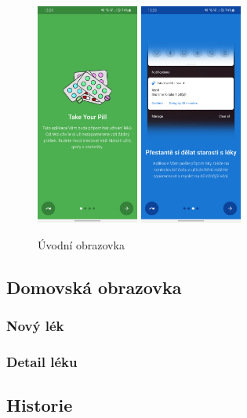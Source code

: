 \documentclass[a4paper,12pt]{report}
\begin{document}
\begin{figure}[h]
    \centering
    \includegraphics[width=0.3\textwidth]{app-intro-screenshot}
    \includegraphics[width=0.3\textwidth]{app-intro-screenshot-2}
    \caption{Úvodní obrazovka}
\end{figure}


\subsection{Domovská obrazovka}
\subsubsection{Nový lék}
\subsubsection{Detail léku}
\subsection{Historie}
\end{document}
